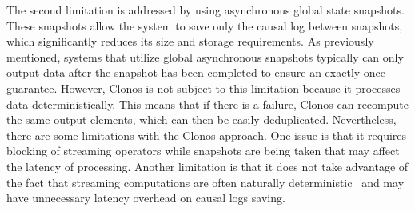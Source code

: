 The second limitation is addressed by using asynchronous global state snapshots. These snapshots allow the system to save only the causal log between snapshots, which significantly reduces its size and storage requirements. As previously mentioned, systems that utilize global asynchronous snapshots typically can only output data after the snapshot has been completed to ensure an exactly-once guarantee. However, Clonos is not subject to this limitation because it processes data deterministically. This means that if there is a failure, Clonos can recompute the same output elements, which can then be easily deduplicated. Nevertheless, there are some limitations with the Clonos approach. One issue is that it requires blocking of streaming operators while snapshots are being taken that may affect the latency of processing. Another limitation is that it does not take advantage of the fact that streaming computations are often naturally deterministic~\cite{Wang:2019:LSF:3341301.3359653, silvestre2021clonos} and may have unnecessary latency overhead on causal logs saving.

